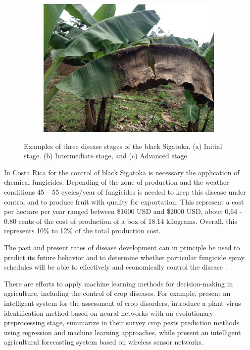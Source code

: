 \documentclass[review]{elsarticle}
\begin{document}
\begin{figure}[h]
\begin{subfigure}{.3\textwidth}
  \caption{}
  \label{fig:sfig2}
\end{subfigure}
\begin{subfigure}{.3\textwidth}
  \centering
  \includegraphics[width=.8\linewidth]{Roya_c}
  \caption{}
  \label{fig:sfig3}
\end{subfigure}
\caption{Examples of three disease stages of the black Sigatoka. (a) Initial stage. (b) Intermediate stage, and (c) Advanced stage.} 
\label{figura1} 
\end{figure}

In Costa Rica for the control of black Sigatoka is necessary the application of chemical fungicides. Depending of the zone of production and the weather conditions 45 – 55 cycles/year of fungicides is needed to keep this disease under control and to produce fruit with quality for exportation. This represent a cost per hectare per year ranged between \$1600 USD and \$2000 USD, about 0,64 - 0.80 cents of the cost of production of a box of 18.14 kilograms. Overall, this represents 10\% to 12\% of the total production cost.

The past and present rates of disease development  can in principle be used
to predict its future behavior and to determine whether
particular fungicide spray schedules will be able to effectively and
economically control the disease \citet{ChuangJeger1987}.

There are efforts to apply machine learning methods for
decision-making in agriculture, including the control of crop
diseases. For example, \cite{Camargo2012} present an intelligent
system for the assessment of crop disorders, \cite{Huang2010}
introduce a plant virus identification method based on neural networks with an evolutionary preprocessing stage, \cite{Kim2014} summarize in
their survey crop pests prediction methods using regression and
machine learning approaches, while \cite{Zhao2013} present an
intelligent agricultural forecasting system based on wireless sensor
networks.
\end{document}
